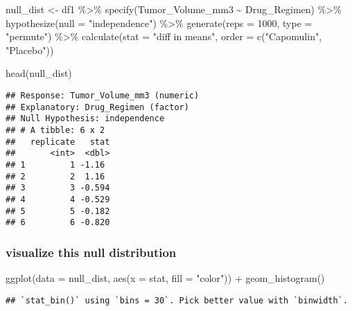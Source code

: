 \documentclass[
]{article}
\newenvironment{Shaded}{\begin{snugshade}}{\end{snugshade}}
\newcommand{\AttributeTok}[1]{\textcolor[rgb]{0.77,0.63,0.00}{#1}}
\newcommand{\DecValTok}[1]{\textcolor[rgb]{0.00,0.00,0.81}{#1}}
\newcommand{\FunctionTok}[1]{\textcolor[rgb]{0.00,0.00,0.00}{#1}}
\newcommand{\NormalTok}[1]{#1}
\newcommand{\OtherTok}[1]{\textcolor[rgb]{0.56,0.35,0.01}{#1}}
\newcommand{\SpecialCharTok}[1]{\textcolor[rgb]{0.00,0.00,0.00}{#1}}
\newcommand{\StringTok}[1]{\textcolor[rgb]{0.31,0.60,0.02}{#1}}
\begin{document}
\begin{Shaded}
\begin{Highlighting}[]
\NormalTok{null\_dist }\OtherTok{\textless{}{-}}\NormalTok{ df1 }\SpecialCharTok{\%\textgreater{}\%}
  \FunctionTok{specify}\NormalTok{(Tumor\_Volume\_mm3 }\SpecialCharTok{\textasciitilde{}}\NormalTok{ Drug\_Regimen) }\SpecialCharTok{\%\textgreater{}\%}
  \FunctionTok{hypothesize}\NormalTok{(}\AttributeTok{null =} \StringTok{"independence"}\NormalTok{) }\SpecialCharTok{\%\textgreater{}\%}
  \FunctionTok{generate}\NormalTok{(}\AttributeTok{reps =} \DecValTok{1000}\NormalTok{, }\AttributeTok{type =} \StringTok{"permute"}\NormalTok{) }\SpecialCharTok{\%\textgreater{}\%}
  \FunctionTok{calculate}\NormalTok{(}\AttributeTok{stat =} \StringTok{"diff in means"}\NormalTok{, }\AttributeTok{order =} \FunctionTok{c}\NormalTok{(}\StringTok{"Capomulin"}\NormalTok{, }\StringTok{"Placebo"}\NormalTok{))}

\FunctionTok{head}\NormalTok{(null\_dist)}
\end{Highlighting}
\end{Shaded}

\begin{verbatim}
## Response: Tumor_Volume_mm3 (numeric)
## Explanatory: Drug_Regimen (factor)
## Null Hypothesis: independence
## # A tibble: 6 x 2
##   replicate   stat
##       <int>  <dbl>
## 1         1 -1.16 
## 2         2  1.16 
## 3         3 -0.594
## 4         4 -0.529
## 5         5 -0.182
## 6         6 -0.820
\end{verbatim}

\hypertarget{visualize-this-null-distribution}{%
\subsubsection{visualize this null
distribution}\label{visualize-this-null-distribution}}

\begin{Shaded}
\begin{Highlighting}[]
\FunctionTok{ggplot}\NormalTok{(}\AttributeTok{data =}\NormalTok{ null\_dist, }\FunctionTok{aes}\NormalTok{(}\AttributeTok{x =}\NormalTok{ stat, }\AttributeTok{fill =} \StringTok{"color"}\NormalTok{)) }\SpecialCharTok{+}
  \FunctionTok{geom\_histogram}\NormalTok{()}
\end{Highlighting}
\end{Shaded}

\begin{verbatim}
## `stat_bin()` using `bins = 30`. Pick better value with `binwidth`.
\end{verbatim}
\end{document}
